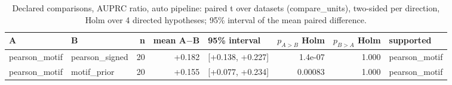 \begin{table}[H]\centering\small
\caption{Declared comparisons, AUPRC ratio, auto pipeline: paired t over datasets (compare\_units), two-sided per direction, Holm over 4 directed hypotheses; 95\% interval of the mean paired difference.}
\begin{tabular}{llrrlrrl}\toprule
A & B & n & mean A$-$B & 95\% interval & $p_{A>B}$ Holm & $p_{B>A}$ Holm & supported \\ \midrule
pearson\_motif & pearson\_signed & 20 & +0.182 & [+0.138, +0.227] & 1.4e-07 & 1.000 & pearson\_motif \\
pearson\_motif & motif\_prior & 20 & +0.155 & [+0.077, +0.234] & 0.00083 & 1.000 & pearson\_motif \\
\bottomrule\end{tabular}\end{table}

